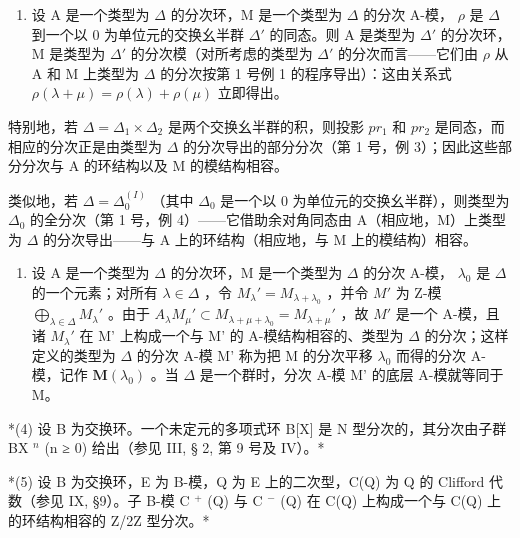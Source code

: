 \begin{enumerate}
\def\labelenumi{(\arabic{enumi})}
\setcounter{enumi}{1}
\tightlist
\item
  设 A 是一个类型为 \(\Delta\) 的分次环，M 是一个类型为 \(\Delta\) 的分次 A-模， \(\rho\) 是 \(\Delta\) 到一个以 0 为单位元的交换幺半群 \(\Delta'\) 的同态。则 A 是类型为 \(\Delta'\) 的分次环，M 是类型为 \(\Delta'\) 的分次模（对所考虑的类型为 \(\Delta'\) 的分次而言——它们由 \(\rho\) 从 A 和 M 上类型为 \(\Delta\) 的分次按第 1 号例 1 的程序导出）：这由关系式 \(\rho(\lambda + \mu) = \rho(\lambda) + \rho(\mu)\) 立即得出。
\end{enumerate}

特别地，若 \(\Delta = \Delta_{1} \times \Delta_{2}\) 是两个交换幺半群的积，则投影 \(pr_{1}\) 和 \(pr_{2}\) 是同态，而相应的分次正是由类型为 \(\Delta\) 的分次导出的部分分次（第 1 号，例 3）；因此这些部分分次与 A 的环结构以及 M 的模结构相容。

类似地，若 \(\Delta = \Delta_0^{(I)}\) （其中 \(\Delta_0\) 是一个以 0 为单位元的交换幺半群），则类型为 \(\Delta_0\) 的全分次（第 1 号，例 4）——它借助余对角同态由 A（相应地，M）上类型为 \(\Delta\) 的分次导出——与 A 上的环结构（相应地，与 M 上的模结构）相容。

\begin{enumerate}
\def\labelenumi{(\arabic{enumi})}
\setcounter{enumi}{2}
\tightlist
\item
  设 A 是一个类型为 \(\Delta\) 的分次环，M 是一个类型为 \(\Delta\) 的分次 A-模， \(\lambda_0\) 是 \(\Delta\) 的一个元素；对所有 \(\lambda \in \Delta\) ，令 \(M_{\lambda}' = M_{\lambda + \lambda_0}\) ，并令 \(M'\) 为 Z-模 \(\bigoplus_{\lambda \in \Delta} M_{\lambda}'\) 。由于 \(A_{\lambda}M_{\mu}' \subset M_{\lambda + \mu + \lambda_0} = M_{\lambda + \mu}'\) ，故 \(M'\) 是一个 A-模，且诸 \(M_{\lambda}'\) 在 M' 上构成一个与 M' 的 A-模结构相容的、类型为 \(\Delta\) 的分次；这样定义的类型为 \(\Delta\) 的分次 A-模 M' 称为把 M 的分次平移 \(\lambda_{0}\) 而得的分次 A-模，记作 \(\mathbf{M}(\lambda_{0})\) 。当 \(\Delta\) 是一个群时，分次 A-模 M' 的底层 A-模就等同于 M。
\end{enumerate}

*(4) 设 B 为交换环。一个未定元的多项式环 B{[}X{]} 是 N 型分次的，其分次由子群 BX \(^{n}\) (n ≥ 0) 给出（参见 III, § 2, 第 9 号及 IV）。*

*(5) 设 B 为交换环，E 为 B-模，Q 为 E 上的二次型，C(Q) 为 Q 的 Clifford 代数（参见 IX, §9）。子 B-模 C \(^{+}\) (Q) 与 C \(^{-}\) (Q) 在 C(Q) 上构成一个与 C(Q) 上的环结构相容的 Z/2Z 型分次。*

